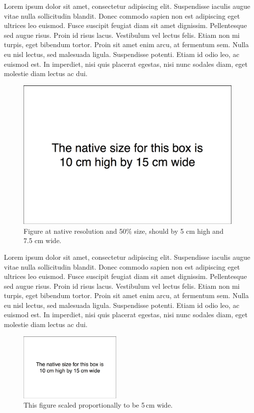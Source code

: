 \documentclass{article}
\begin{document}
\noindent
Lorem ipsum dolor sit amet, consectetur adipiscing elit. Suspendisse
iaculis augue vitae nulla sollicitudin blandit. Donec commodo sapien non
est adipiscing eget ultrices leo euismod. Fusce suscipit feugiat diam
sit amet dignissim. Pellentesque sed augue risus. Proin id risus lacus.
Vestibulum vel lectus felis. Etiam non mi turpis, eget bibendum tortor.
Proin sit amet enim arcu, at fermentum sem. Nulla eu nisl lectus, sed
malesuada ligula. Suspendisse potenti. Etiam id odio leo, ac euismod
est. In imperdiet, nisi quis placerat egestas, nisi nunc sodales diam,
eget molestie diam lectus ac dui.

\begin{figure}
\includegraphics[scale=0.5]{fig_10x15.png}
\caption{Figure at native resolution and 50\% size, should by 5 cm high
and 7.5 cm wide.} 
\label{figure1}
\end{figure}

\noindent
Lorem ipsum dolor sit amet, consectetur adipiscing elit. Suspendisse
iaculis augue vitae nulla sollicitudin blandit. Donec commodo sapien non
est adipiscing eget ultrices leo euismod. Fusce suscipit feugiat diam
sit amet dignissim. Pellentesque sed augue risus. Proin id risus lacus.
Vestibulum vel lectus felis. Etiam non mi turpis, eget bibendum tortor.
Proin sit amet enim arcu, at fermentum sem. Nulla eu nisl lectus, sed
malesuada ligula. Suspendisse potenti. Etiam id odio leo, ac euismod
est. In imperdiet, nisi quis placerat egestas, nisi nunc sodales diam,
eget molestie diam lectus ac dui.

\begin{figure}
\includegraphics[width=5cm]{fig_10x15.png}
\caption{This figure scaled proportionally to be 5\,cm wide.} 
\label{figure2}
\end{figure}
\end{document}
